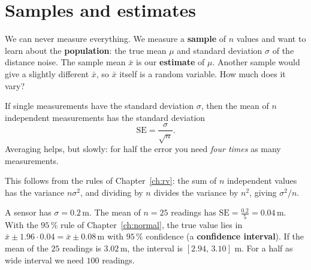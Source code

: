 \begin{center}
\label{fig:pr5_hist}
\end{center}

\section*{Samples and estimates}
We can never measure everything. We measure a \textbf{sample} of $n$ values and want to learn about the \textbf{population}: the true mean $\mu$ and standard deviation $\sigma$ of the distance noise. The sample mean $\bar x$ is our \textbf{estimate} of $\mu$. Another sample would give a slightly different $\bar x$, so $\bar x$ itself is a random variable. How much does it vary?

\begin{keyidea}
If single measurements have the standard deviation $\sigma$, then the mean of $n$ independent measurements has the standard deviation
\[
\mathrm{SE}=\frac{\sigma}{\sqrt n}.
\]
Averaging helps, but slowly: for half the error you need \emph{four times} as many measurements.
\end{keyidea}

This follows from the rules of Chapter~\ref{ch:rv}: the sum of $n$ independent values has the variance $n\sigma^2$, and dividing by $n$ divides the variance by $n^2$, giving $\sigma^2/n$.

\begin{example}
A sensor has $\sigma=0.2$\,m. The mean of $n=25$ readings has $\mathrm{SE}=\frac{0.2}{5}=0.04$\,m. With the $95\,\%$ rule of Chapter~\ref{ch:normal}, the true value lies in $\bar x\pm1.96\cdot0.04=\bar x\pm0.08$\,m with $95\,\%$ confidence (a \textbf{confidence interval}). If the mean of the $25$ readings is $3.02$\,m, the interval is $[2.94,\,3.10]$ m. For a half as wide interval we need $100$ readings.
\end{example}

